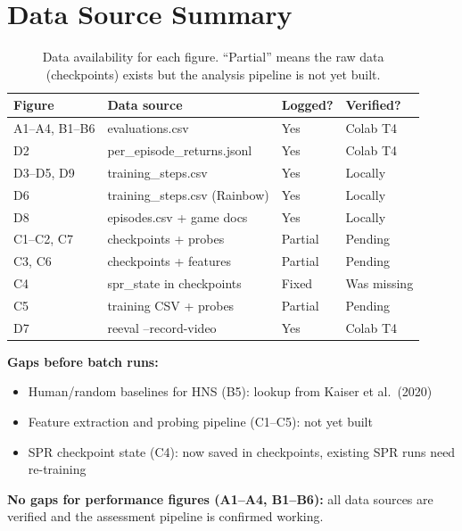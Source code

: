 \documentclass[11pt]{article}
\begin{document}
\section{Data Source Summary}
\label{app:data}

\begin{table}[H]
\centering
\small
\renewcommand{\arraystretch}{1.3}
\setlength{\tabcolsep}{4pt}
\begin{tabular}{l l l l}
\toprule
\textbf{Figure} & \textbf{Data source} & \textbf{Logged?}
  & \textbf{Verified?} \\
\midrule
A1--A4, B1--B6 & evaluations.csv & Yes & Colab T4 \\
D2 & per\_episode\_returns.jsonl & Yes & Colab T4 \\
D3--D5, D9 & training\_steps.csv & Yes & Locally \\
D6 & training\_steps.csv (Rainbow) & Yes & Locally \\
D8 & episodes.csv + game docs & Yes & Locally \\
C1--C2, C7 & checkpoints + probes & Partial & Pending \\
C3, C6 & checkpoints + features & Partial & Pending \\
C4 & spr\_state in checkpoints & Fixed & Was missing \\
C5 & training CSV + probes & Partial & Pending \\
D7 & reeval --record-video & Yes & Colab T4 \\
\bottomrule
\end{tabular}
\caption{Data availability for each figure. ``Partial'' means the
raw data (checkpoints) exists but the analysis pipeline is not yet
built.}
\end{table}

\noindent\textbf{Gaps before batch runs:}
\begin{itemize}[leftmargin=2em, itemsep=0.2em]
  \item Human/random baselines for HNS (B5): lookup from
    Kaiser et al.\ (2020)
  \item Feature extraction and probing pipeline (C1--C5):
    not yet built
  \item SPR checkpoint state (C4): now saved in checkpoints,
    existing SPR runs need re-training
\end{itemize}

\noindent\textbf{No gaps for performance figures (A1--A4, B1--B6):}
all data sources are verified and the assessment pipeline is
confirmed working.
\end{document}
